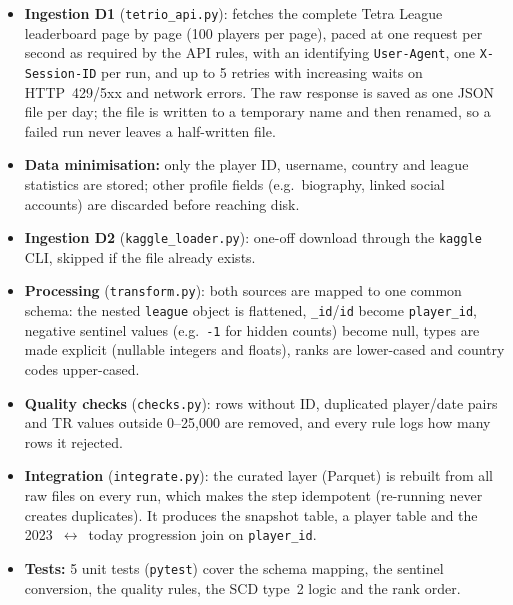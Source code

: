 \documentclass[11pt,a4paper]{article}
\begin{document}
\begin{itemize}
  \item \textbf{Ingestion D1} (\texttt{tetrio\_api.py}): fetches the complete
        Tetra League leaderboard page by page (100 players per page), paced at
        one request per second as required by the API rules, with an
        identifying \texttt{User-Agent}, one \texttt{X-Session-ID} per run, and
        up to 5 retries with increasing waits on HTTP~429/5xx and network
        errors. The raw response is saved as one JSON file per day; the file is
        written to a temporary name and then renamed, so a failed run never
        leaves a half-written file.
  \item \textbf{Data minimisation:} only the player ID, username, country and
        league statistics are stored; other profile fields (e.g.\ biography,
        linked social accounts) are discarded before reaching disk.
  \item \textbf{Ingestion D2} (\texttt{kaggle\_loader.py}): one-off download
        through the \texttt{kaggle} CLI, skipped if the file already exists.
  \item \textbf{Processing} (\texttt{transform.py}): both sources are mapped
        to one common schema: the nested \texttt{league} object is flattened,
        \texttt{\_id}/\texttt{id} become \texttt{player\_id}, negative sentinel
        values (e.g.\ \texttt{-1} for hidden counts) become null, types are
        made explicit (nullable integers and floats), ranks are lower-cased and
        country codes upper-cased.
  \item \textbf{Quality checks} (\texttt{checks.py}): rows without ID,
        duplicated player/date pairs and TR values outside 0--25{,}000 are
        removed, and every rule logs how many rows it rejected.
  \item \textbf{Integration} (\texttt{integrate.py}): the curated layer
        (Parquet) is rebuilt from all raw files on every run, which makes the
        step idempotent (re-running never creates duplicates). It produces the
        snapshot table, a player table and the 2023~$\leftrightarrow$~today
        progression join on \texttt{player\_id}.
  \item \textbf{Tests:} 5 unit tests (\texttt{pytest}) cover the schema
        mapping, the sentinel conversion, the quality rules, the SCD type~2
        logic and the rank order.
\end{itemize}

\end{document}

